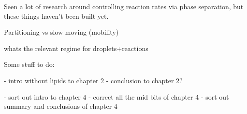 Seen a lot of research around controlling reaction rates via phase separation, but these things haven't been built yet.

Partitioning vs slow moving (mobility)

whats the relevant regime for droplets+reactions


Some stuff to do:

- intro without lipids to chapter 2
- conclusion to chapter 2?

- sort out intro to chapter 4
- correct all the mid bits of chapter 4
- sort out summary and conclusions of chapter 4
